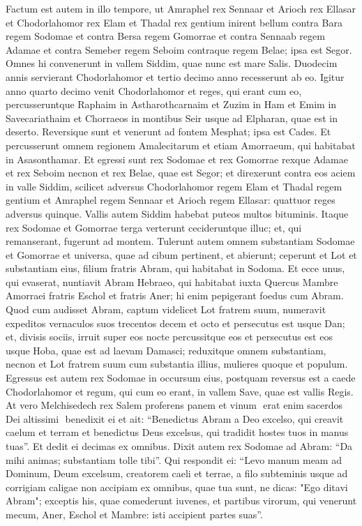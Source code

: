 \begin{biblechapter}  
\verse Factum est autem in illo tempore, ut Amraphel rex Sennaar et Arioch rex Ellasar et Chodorlahomor rex Elam et Thadal rex gentium 
\verse inirent bellum contra Bara regem Sodomae et contra Bersa regem Gomorrae et contra Sennaab regem Adamae et contra Semeber regem Seboim contraque regem Belae; ipsa est Segor. 
\verse Omnes hi convenerunt in vallem Siddim, quae nunc est mare Salis. 
\verse Duodecim annis servierant Chodorlahomor et tertio decimo anno recesserunt ab eo. 
\verse Igitur anno quarto decimo venit Chodorlahomor et reges, qui erant cum eo, percusseruntque Raphaim in Astharothcarnaim et Zuzim in Ham et Emim in Savecariathaim 
\verse et Chorraeos in montibus Seir usque ad Elpharan, quae est in deserto. 
\verse Reversique sunt et venerunt ad fontem Mesphat; ipsa est Cades. Et percusserunt omnem regionem Amalecitarum et etiam Amorraeum, qui habitabat in Asasonthamar. 
\verse Et egressi sunt rex Sodomae et rex Gomorrae rexque Adamae et rex Seboim necnon et rex Belae, quae est Segor; et direxerunt contra eos aciem in valle Siddim, 
\verse scilicet adversus Chodorlahomor regem Elam et Thadal regem gentium et Amraphel regem Sennaar et Arioch regem Ellasar: quattuor reges adversus quinque. 
\verse Vallis autem Siddim habebat puteos multos bituminis. Itaque rex Sodomae et Gomorrae terga verterunt cecideruntque illuc; et, qui remanserant, fugerunt ad montem. 
\verse Tulerunt autem omnem substantiam Sodomae et Gomorrae et universa, quae ad cibum pertinent, et abierunt; 
\verse ceperunt et Lot et substantiam eius, filium fratris Abram, qui habitabat in Sodoma. 
\verse Et ecce unus, qui evaserat, nuntiavit Abram Hebraeo, qui habitabat iuxta Quercus Mambre Amorraei fratris Eschol et fratris Aner; hi enim pepigerant foedus cum Abram. 
\verse Quod cum audisset Abram, captum videlicet Lot fratrem suum, numeravit expeditos vernaculos suos trecentos decem et octo et persecutus est usque Dan; 
\verse et, divisis sociis, irruit super eos nocte percussitque eos et persecutus est eos usque Hoba, quae est ad laevam Damasci; 
\verse reduxitque omnem substantiam, necnon et Lot fratrem suum cum substantia illius, mulieres quoque et populum. 
\verse Egressus est autem rex Sodomae in occursum eius, postquam reversus est a caede Chodorlahomor et regum, qui cum eo erant, in vallem Save, quae est vallis Regis. 
\verse At vero Melchisedech rex Salem proferens panem et vinum ­ erat enim sacerdos Dei altissimi ­ 
\verse benedixit ei et ait: “Benedictus Abram a Deo excelso, qui creavit caelum et terram 
\verse et benedictus Deus excelsus, qui tradidit hostes tuos in manus tuas”. Et dedit ei decimas ex omnibus. 
\verse Dixit autem rex Sodomae ad Abram: “Da mihi animas; substantiam tolle tibi”. 
\verse Qui respondit ei: “Levo manum meam ad Dominum, Deum excelsum, creatorem caeli et terrae,
\verse a filo subteminis usque ad corrigiam caligae non accipiam ex omnibus, quae tua sunt, ne dicas: "Ego ditavi Abram"; 
\verse exceptis his, quae comederunt iuvenes, et partibus virorum, qui venerunt mecum, Aner, Eschol et Mambre: isti accipient partes suas”. 
\end{biblechapter}

